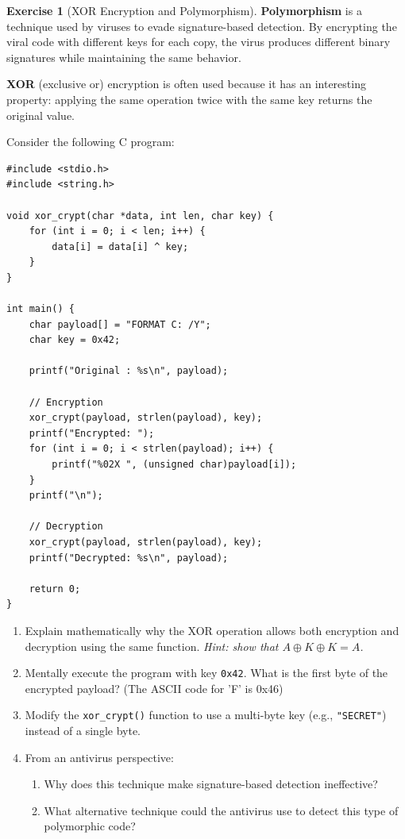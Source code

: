 \documentclass[a4paper,11pt]{article}
\theoremstyle{plain}
\theoremstyle{definition}
\newtheorem{exercice}{Exercise}
\begin{document}
\begin{exercice}[XOR Encryption and Polymorphism]

\textbf{Polymorphism} is a technique used by viruses to evade signature-based detection. By encrypting the viral code with different keys for each copy, the virus produces different binary signatures while maintaining the same behavior.

\textbf{XOR} (exclusive or) encryption is often used because it has an interesting property: applying the same operation twice with the same key returns the original value.

Consider the following C program:

\begin{verbatim}
#include <stdio.h>
#include <string.h>

void xor_crypt(char *data, int len, char key) {
    for (int i = 0; i < len; i++) {
        data[i] = data[i] ^ key;
    }
}

int main() {
    char payload[] = "FORMAT C: /Y";
    char key = 0x42;

    printf("Original : %s\n", payload);

    // Encryption
    xor_crypt(payload, strlen(payload), key);
    printf("Encrypted: ");
    for (int i = 0; i < strlen(payload); i++) {
        printf("%02X ", (unsigned char)payload[i]);
    }
    printf("\n");

    // Decryption
    xor_crypt(payload, strlen(payload), key);
    printf("Decrypted: %s\n", payload);

    return 0;
}
\end{verbatim}

\begin{enumerate}
\item Explain mathematically why the XOR operation allows both encryption and decryption using the same function. \textit{Hint: show that $A \oplus K \oplus K = A$.}

\item Mentally execute the program with key \texttt{0x42}. What is the first byte of the encrypted payload? (The ASCII code for 'F' is 0x46)

\item Modify the \texttt{xor\_crypt()} function to use a multi-byte key (e.g., \texttt{"SECRET"}) instead of a single byte.

\item From an antivirus perspective:
\begin{enumerate}
\item Why does this technique make signature-based detection ineffective?
\item What alternative technique could the antivirus use to detect this type of polymorphic code?
\end{enumerate}
\end{enumerate}

\end{exercice}
\end{document}
